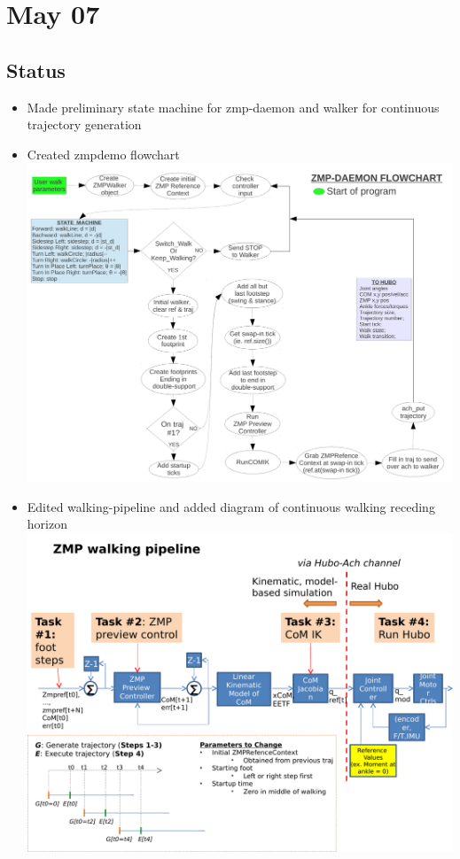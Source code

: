 \documentclass[letterpaper, 10 pt]{report}
\begin{document}
\section*{May  07}
\subsection*{Status}
\begin{itemize}
\item Made preliminary state machine for zmp-daemon and walker for continuous trajectory generation
\item Created zmpdemo flowchart
\newline \includegraphics[width=\linewidth]{resources/zmp-daemon-flowchart}
\item Edited walking-pipeline and added diagram of continuous walking receding horizon
\newline \includegraphics[width=\linewidth]{resources/zmp-walking-pipeline}
\end{itemize}
\end{document}
